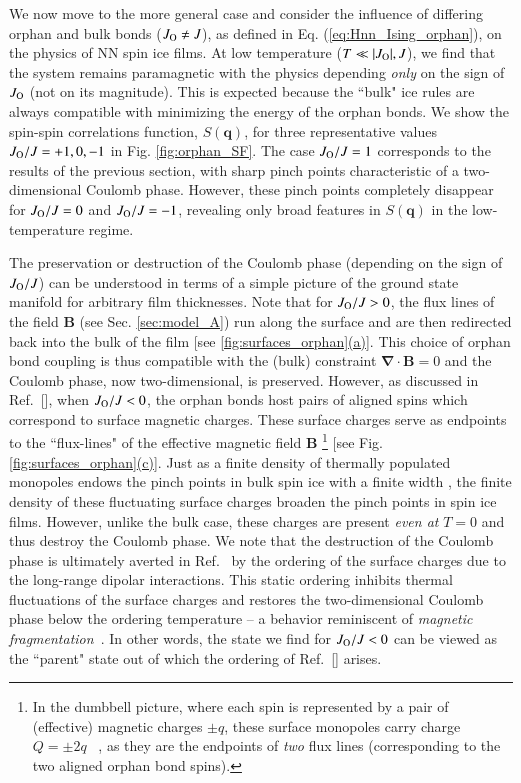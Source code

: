 \documentclass[aps,prx,reprint,runinaddress,superscriptaddress,amsmath,amssymb,floatfix,longbibliography]{revtex4-1}
\renewcommand{\vec}[1]{\boldsymbol{#1}}
\newcommand{\Jo}{J_{\rm O}}
\newcommand{\subref}[2]{\ref{#1}\hyperref[#1]{#2}}
\begin{document}
We now move to the more general case and consider the influence of differing orphan and bulk bonds ($\Jo \neq J$), as defined in Eq. (\ref{eq:Hnn_Ising_orphan}), on the physics of \ac{NN} spin ice films. At low temperature ($T \ll |\Jo|, J$), we find that the system remains paramagnetic with the physics depending \emph{only} on the sign of $\Jo$ (not on its magnitude). This is expected because the ``bulk" ice rules are always compatible with minimizing the energy of the orphan bonds. We show the spin-spin correlations function, $S(\vec{q})$, for three representative values $\Jo/J = +1, 0,-1$ in Fig. \ref{fig:orphan_SF}. The case $\Jo/J = 1$ corresponds to the results of the previous section, with sharp pinch points characteristic of a two-dimensional Coulomb phase. However, these pinch points completely  disappear for $\Jo/J = 0$ and $\Jo/J = -1$, revealing only broad features in $S(\vec{q})$ in the low-temperature regime.

The preservation or destruction of the Coulomb phase (depending on the sign of $\Jo/J$) can be understood in terms of a simple picture of the ground state manifold for arbitrary film thicknesses. Note that for $\Jo/J > 0$, the flux lines of the field $\vec{B}$ (see Sec. \ref{sec:model_A}) run along the surface and are then redirected back into the bulk of the film [see \subref{fig:surfaces_orphan}{(a)}]. This choice of orphan bond coupling is thus compatible with the (bulk) constraint $\vec{\nabla} \cdot \vec{B} = 0$ and the Coulomb phase, now two-dimensional, is preserved. However, as discussed in Ref.~[], when $\Jo / J < 0$, the orphan bonds host pairs of aligned spins which correspond to surface magnetic charges. These surface charges serve as endpoints to the ``flux-lines" of the effective magnetic field $\vec{B}$ \footnote{In the dumbbell picture, where each spin is represented by a pair of (effective) magnetic charges $\pm q$, these surface monopoles carry charge $Q = \pm 2q$ ~\cite{Jaubert2016}, as they are the endpoints of \emph{two} flux lines (corresponding to the two aligned orphan bond spins).} [see Fig. \subref{fig:surfaces_orphan}{(c)}]. Just as a finite density of thermally populated monopoles endows the pinch points in bulk spin ice with a finite width \cite{Henley2010,Castelnovo2011}, the finite density of these fluctuating surface charges broaden the pinch points in spin ice films. However, unlike the bulk case, these charges are present \emph{even at} $T=0$ and thus destroy the Coulomb phase. We note that the destruction of the Coulomb phase is ultimately averted in Ref.~\cite{Jaubert2016} by the ordering of the surface charges due to the long-range dipolar interactions. This static ordering inhibits thermal fluctuations of the surface charges and restores the two-dimensional Coulomb phase below the ordering temperature -- a behavior reminiscent of \emph{magnetic fragmentation}~\cite{Brooks-Bartlett2014}. In other words, the state we find for $\Jo/J < 0$ can be viewed as the ``parent" state out of which the ordering of Ref.~[] arises.  
\end{document}
